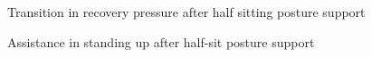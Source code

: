         \begin{figure}[t]%
                \begin{center}%
                 \caption{Transition in recovery pressure after half sitting posture support}%
                \end{center}%
        \end{figure}%
        \begin{figure}[t]%
                \begin{center}%
                 \caption{Assistance in standing up after half-sit posture support}%
                \end{center}%
        \end{figure}%
